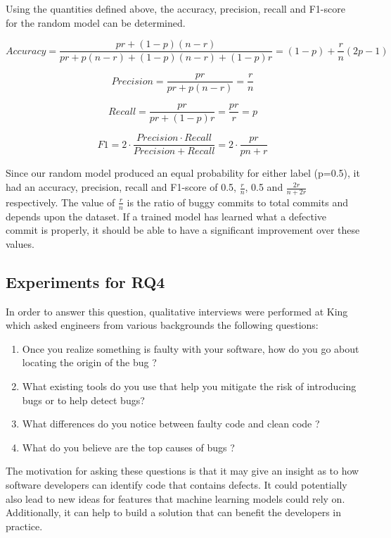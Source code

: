 \documentclass[../main.tex]{subfiles}
\begin{document}
Using the quantities defined above, the accuracy, precision, recall and F1-score for the random model can be determined.
   
\begin{equation}\label{eqn:randAccuracy}
     Accuracy = \frac{pr+(1-p)(n-r)}{pr+p(n-r)+(1-p)(n-r)+(1-p)r} = (1-p) + \frac{r}{n}(2p-1)
\end{equation}

\begin{equation}\label{eqn:randPrecision}
    Precision = \frac{pr}{pr+p(n-r)} = \frac{r}{n}
\end{equation}

\begin{equation}\label{eqn:randRecall}
    Recall = \frac{pr}{pr+(1-p)r}=\frac{pr}{r} = p
\end{equation}


\begin{equation}\label{eqn:randF1}
    F1 = 2 \cdot \frac{Precision \cdot Recall}{Precision + Recall} = 2 \cdot \frac{pr}{pn+r} 
\end{equation}

\vspace{20pt}

Since our random model produced an equal probability for either label (p=0.5), it had an accuracy, precision, recall and F1-score of 0.5, $\frac{r}{n}$, 0.5 and $\frac{2r}{n+2r}$ respectively. The value of $\frac{r}{n}$ is the ratio of buggy commits to total commits and depends upon the dataset. If a trained model has learned what a defective commit is properly, it should be able to have a significant improvement over these values. 

\subsection{Experiments for RQ4}

In order to answer this question, qualitative interviews were performed at King which asked engineers from various backgrounds the following questions:

\begin{enumerate}
    \item Once you realize something is faulty with your software, how do you go about locating the origin of the bug ?
    \item What existing tools do you use that help you mitigate the risk of introducing bugs or to help detect bugs?
    \item What differences do you notice between faulty code and clean code ?
    \item What do you believe are the top causes of bugs ? 
\end{enumerate}

The motivation for asking these questions is that it may give an insight as to how software developers can identify code that contains defects. It could potentially also lead to new ideas for features that machine learning models could rely on. Additionally, it can help to build a solution that can benefit the developers in practice. 
\end{document}
